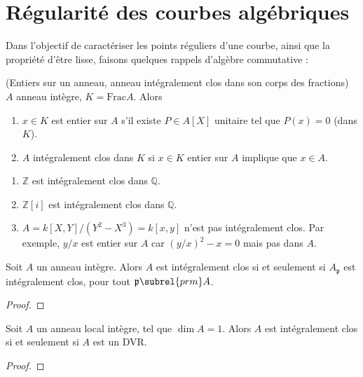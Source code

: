     \section{Régularité des courbes algébriques}
        Dans l'objectif de caractériser les points réguliers d'une courbe, ainsi que la propriété d'être lisse, faisons quelques rappels d'algèbre commutative :
        \begin{defi} (Entiers sur un anneau, anneau intégralement clos dans son corps des fractions)
            $A$ anneau intègre, $K = \mathrm{Frac} A$. Alors
            \begin{enumerate}
                \item $x \in K$ est entier sur $A$ s'il existe $P \in A[X]$ unitaire tel que $P(x) = 0$ (dans $K$).
                \item $A$ intégralement clos dans $K$ si $x \in K$ entier sur $A$ implique que $x \in A$.
            \end{enumerate}
        \end{defi}
        \begin{expl}
            \begin{enumerate}
                \item $\mathbb{Z}$ est intégralement clos dans $\mathbb{Q}$.
                \item $\mathbb{Z}[i]$ est intégralement clos dans $\mathbb{Q}$.
                \item $A = k[X,Y]/(Y^2 - X^3) = k[x,y]$ n'est pas intégralement clos. Par exemple, $y/x$ est entier sur $A$ car $(y/x)^2 - x = 0$ mais pas dans $A$.
            \end{enumerate}
        \end{expl}
        \begin{theo}
            Soit $A$ un anneau intègre. Alors $A$ est intégralement clos si et seulement si $A_\mathfrak{p}$ est intégralement clos, pour tout $\mathfrak{p} \subrel{prm} A$.
        \end{theo}
        \begin{proof}
        \end{proof}
        \begin{theo}
            Soit $A$ un anneau local intègre, tel que $\dim A = 1$. Alors $A$ est intégralement clos si et seulement si $A$ est un DVR.
        \end{theo}
        \begin{proof}
        \end{proof}

